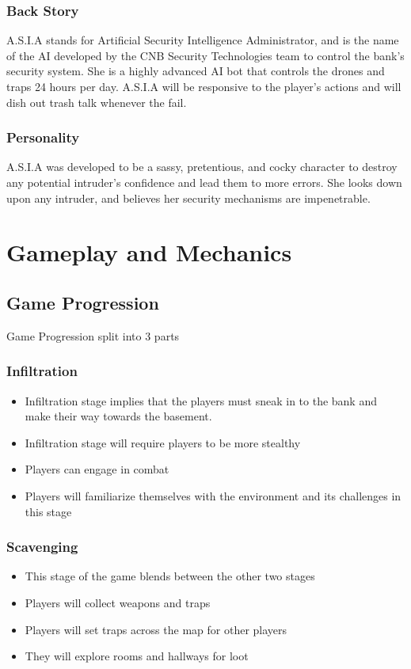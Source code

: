 \documentclass[11pt]{report}
\begin{document}
\subsection{Back Story}

A.S.I.A stands for Artificial Security Intelligence Administrator, and is the name of the AI developed by the CNB Security Technologies team to control the bank’s security system. She is a highly advanced AI bot that controls the drones and traps 24 hours per day. A.S.I.A will be responsive to the player’s actions and will dish out trash talk whenever the fail.

\subsection{Personality}

A.S.I.A was developed to be a sassy, pretentious, and cocky character to destroy any potential intruder’s confidence and lead them to more errors. She looks down upon any intruder, and believes her security mechanisms are impenetrable.


\chapter{Gameplay and Mechanics}

\section{Game Progression}
Game Progression split into 3 parts

\subsection{Infiltration}
\begin{itemize}
    \item Infiltration stage implies that the players must sneak in to the bank and make their way towards the basement.
    \item Infiltration stage will require players to be more stealthy
    \item Players can engage in combat
    \item Players will familiarize themselves with the environment and its challenges in this stage
\end{itemize}
\subsection{Scavenging}
\begin{itemize}
    \item This stage of the game blends between the other two stages
    \item Players will collect weapons and traps
    \item Players will set traps across the map for other players
    \item They will explore rooms and hallways for loot 
\end{itemize}
\end{document}
